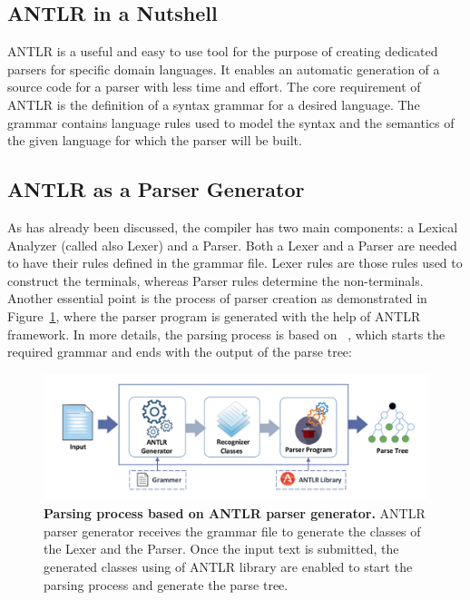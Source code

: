 \subsection{ANTLR in a Nutshell }
ANTLR is a useful and easy to use tool for the purpose of creating dedicated parsers for specific domain languages. 
It enables an automatic generation of a source code for a parser with less time and effort. 
The core requirement of ANTLR is the definition of a syntax grammar for a desired language. 
The grammar contains language rules used to model the syntax and the semantics of the given language for which the parser will be built. 

\subsection{ANTLR as a Parser Generator}
As has already been discussed, the compiler has two main components: a Lexical Analyzer (called also Lexer) and a Parser. 
Both a Lexer and a Parser are needed to have their rules defined in the grammar file. 
Lexer rules are those rules used to construct the terminals, whereas Parser rules determine the non-terminals. 
Another essential point is the process of parser creation as demonstrated in Figure~\ref{Fig:ANTLR}, where the parser program is generated with the help of ANTLR framework. 
In more details, the parsing process is based on ~\cite{ANTLR:Tool:Online}, which starts the required grammar and ends with the output of the parse tree:

\begin{figure}[ht]
	\begin{center}
		\includegraphics[scale=0.52]{images/ANTLR.pdf}
		\vspace{-2mm}
		\caption{\textbf{Parsing process based on ANTLR parser generator\cite{ANTLR:Tool:Online}.} 
		ANTLR parser generator receives the grammar file to generate the classes of the Lexer and the Parser.
		Once the input text is submitted, the generated classes using of ANTLR library are enabled to start the parsing process and generate the parse tree.}
		\label{Fig:ANTLR}
	\end{center}
\end{figure}


